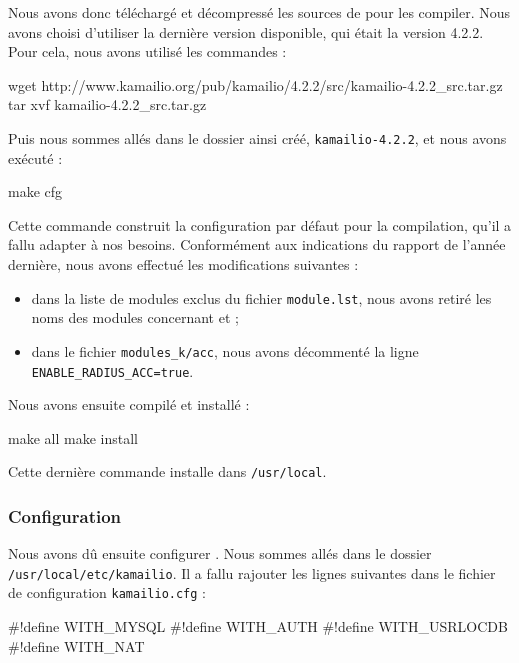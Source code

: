 Nous avons donc téléchargé et décompressé les sources de {\kam} pour les compiler. Nous avons choisi d’utiliser la dernière version disponible, qui était la version 4.2.2. Pour cela, nous avons utilisé les commandes :

\begin{shellcode}
wget http://www.kamailio.org/pub/kamailio/4.2.2/src/kamailio-4.2.2_src.tar.gz
tar xvf kamailio-4.2.2_src.tar.gz
\end{shellcode}

Puis nous sommes allés dans le dossier ainsi créé, \texttt{kamailio-4.2.2}, et nous avons exécuté :

\begin{shellcode}
make cfg
\end{shellcode}

Cette commande construit la configuration par défaut pour la compilation, qu’il a fallu adapter à nos besoins. Conformément aux indications du rapport de l’année dernière, nous avons effectué les modifications suivantes :

\begin{itemize}
	\item{dans la liste de modules exclus du fichier \texttt{module.lst}, nous avons retiré les noms des modules concernant {\my} et {\rad}} ;
	\item{dans le fichier \texttt{modules\_k/acc}, nous avons décommenté la ligne \texttt{ENABLE\_RADIUS\_ACC=true}}.
\end{itemize}

Nous avons ensuite compilé et installé {\kam} :

\begin{shellcode}
make all
make install
\end{shellcode}

Cette dernière commande installe {\kam} dans \texttt{/usr/local}.

\subsubsection{Configuration}

Nous avons dû ensuite configurer {\kam}. Nous sommes allés dans le dossier \texttt{/usr/local/etc/kamailio}. Il a fallu rajouter les lignes suivantes dans le fichier de configuration \texttt{kamailio.cfg} :

\begin{kamcf}
#!define WITH_MYSQL
#!define WITH_AUTH
#!define WITH_USRLOCDB
#!define WITH_NAT
\end{kamcf}

